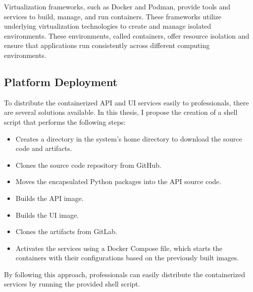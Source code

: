 Virtualization frameworks, such as Docker and Podman, provide tools and services to build, manage, and run containers. These frameworks utilize underlying virtualization technologies to create and manage isolated environments. These environments, called containers, offer resource isolation and ensure that applications run consistently across different computing environments.

\subsection{Platform Deployment}

To distribute the containerized API and UI services easily to professionals, there are several solutions available. In this thesis, I propose the creation of a shell script that performs the following steps:

\begin{itemize}
  \item Creates a directory in the system's home directory to download the source code and artifacts.
  \item Clones the source code repository from GitHub.
  \item Moves the encapsulated Python packages into the API source code.
  \item Builds the API image.
  \item Builds the UI image.
  \item Clones the artifacts from GitLab.
  \item Activates the services using a Docker Compose file, which starts the containers with their configurations based on the previously built images.
\end{itemize}

By following this approach, professionals can easily distribute the containerized services by running the provided shell script.
